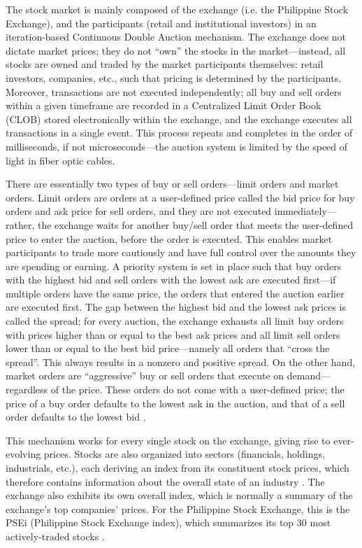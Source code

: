 \documentclass[stu,floatsintext]{apa7}
\begin{document}
The stock market is mainly composed of the exchange (i.e. the Philippine Stock Exchange), and the participants (retail and institutional investors) in an iteration-based Continuous Double Auction mechanism. The exchange does not dictate market prices; they do not “own” the stocks in the market—instead, all stocks are owned and traded by the market participants themselves: retail investors, companies, etc., such that pricing is determined by the participants. Moreover, transactions are not executed independently; all buy and sell orders within a given timeframe are recorded in a Centralized Limit Order Book (CLOB) stored electronically within the exchange, and the exchange executes all transactions in a single event. This process repeats and completes in the order of milliseconds, if not microseconds—the auction system is limited by the speed of light in fiber optic cables.

There are essentially two types of buy or sell orders—limit orders and market orders. Limit orders are orders at a user-defined price called the bid price for buy orders and ask price for sell orders, and they are not executed immediately—rather, the exchange waits for another buy/sell order that meets the user-defined price to enter the auction, before the order is executed. This enables market participants to trade more cautiously and have full control over the amounts they are spending or earning. A priority system is set in place such that buy orders with the highest bid and sell orders with the lowest ask are executed first—if multiple orders have the same price, the orders that entered the auction earlier are executed first. The gap between the highest bid and the lowest ask prices is called the spread; for every auction, the exchange exhausts all limit buy orders with prices higher than or equal to the best ask prices and all limit sell orders lower than or equal to the best bid price—namely all orders that “cross the spread”. This always results in a nonzero and positive spread. On the other hand, market orders are “aggressive” buy or sell orders that execute on demand—regardless of the price. These orders do not come with a user-defined price; the price of a buy order defaults to the lowest ask in the auction, and that of a sell order defaults to the lowest bid \parencite{zaznov2024intraday}.

This mechanism works for every single stock on the exchange, giving rise to ever-evolving prices. Stocks are also organized into sectors (financials, holdings, industrials, etc.), each deriving an index from its constituent stock prices, which therefore contains information about the overall state of an industry \parencite{miguel2019interrelationship}. The exchange also exhibits its own overall index, which is normally a summary of the exchange's top companies' prices. For the Philippine Stock Exchange, this is the PSEi (Philippine Stock Exchange index), which summarizes its top 30 most actively-traded stocks \parencite{gallardo2025ph}.
\end{document}
